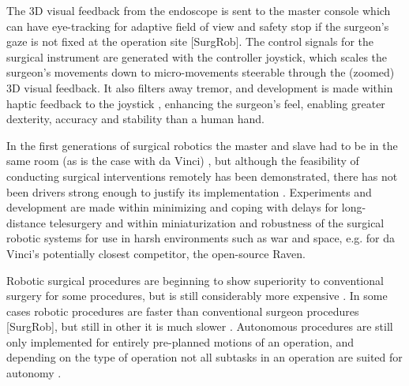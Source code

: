 The 3D visual feedback from the endoscope is sent to the master console which can have eye-tracking for adaptive field of view and safety stop if the surgeon's gaze is not fixed at the operation site [SurgRob]. The control signals for the surgical instrument are generated with the controller joystick, which scales the surgeon's movements down to micro-movements \citep{bib:intuitive_monopoly} steerable through the (zoomed) 3D visual feedback. It also filters away tremor, and development is made within haptic feedback to the joystick \citep[p 89]{bib:surgical_book}, enhancing the surgeon's feel, enabling greater dexterity, accuracy and stability than a human hand.

In the first generations of surgical robotics the master and slave had to be in the same room (as is the case with da Vinci) \citep{bib:telesurg_history,bib:raven_debride,bib:surgical_book}, but although the feasibility of conducting surgical interventions remotely has been demonstrated, there has not been drivers strong enough to justify its implementation \citep[p 38]{bib:surgical_book}. Experiments and development are made within minimizing and coping with delays for long-distance telesurgery and within miniaturization and robustness of the surgical robotic systems for use in harsh environments such as war and space, e.g. for da Vinci's potentially closest competitor, the open-source Raven.

Robotic surgical procedures are beginning to show superiority to conventional surgery for some procedures, but is still considerably more expensive \citep{bib:docatadist}. In some cases robotic procedures are faster than conventional surgeon procedures [SurgRob], but still in other it is much slower \citep{bib:raven_ii,bib:raven_debride}.
Autonomous procedures are still only implemented for entirely pre-planned motions of an operation, and depending on the type of operation not all subtasks in an operation are suited for autonomy \citep{bib:raven_debride,bib:raven_ii}.





